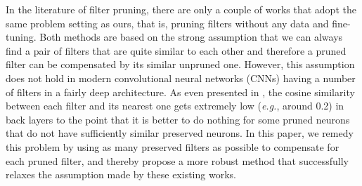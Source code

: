  In the literature of filter pruning, there are only a couple of works \cite{NM, Data-free} that adopt the same problem setting as ours, that is, pruning filters without any data and fine-tuning. Both methods are based on the strong assumption that we can always find a pair of filters that are quite similar to each other and therefore a pruned filter can be compensated by its similar unpruned one. However, this assumption does not hold in modern convolutional neural networks (CNNs) having a number of filters in a fairly deep architecture. As even presented in \cite{NM}, the cosine similarity between each filter and its nearest one gets extremely low (\textit{e.g.}, around 0.2) in back layers to the point that it is better to do nothing for some pruned neurons that do not have sufficiently similar preserved neurons. In this paper, we remedy this problem by using as many preserved filters as possible to compensate for each pruned filter, and thereby propose a more robust method that successfully relaxes the assumption made by these existing works.




